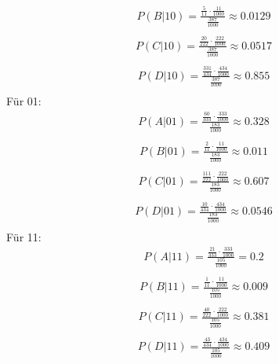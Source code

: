 \begin{align*}
  P(B | 10) = \frac{ \frac{ 5 }{ 11 } \cdot \frac{ 11 }{ 1000 } }{ \frac{ 387 }{ 1000 }  } \approx  0.0129\\
\end{align*}
\begin{align*}
  P(C | 10) = \frac{ \frac{ 20 }{ 222 } \cdot \frac{ 222 }{ 1000 } }{ \frac{ 387 }{ 1000 }  } \approx  0.0517\\
\end{align*}
\begin{align*}
  P(D | 10) = \frac{ \frac{ 331 }{ 434 } \cdot \frac{ 434 }{ 1000 } }{ \frac{ 387 }{ 1000 }  } \approx  0.855\\
\end{align*}
Für 01:
\begin{align*}
  P(A | 01) = \frac{ \frac{ 60 }{ 333 } \cdot \frac{ 333 }{ 1000 } }{ \frac{ 183 }{ 1000 }  } \approx  0.328\\
\end{align*}
\begin{align*}
  P(B | 01) = \frac{ \frac{ 2 }{ 11 } \cdot \frac{ 11 }{ 1000 } }{ \frac{ 183 }{ 1000 }  } \approx  0.011\\
\end{align*}
\begin{align*}
  P(C | 01) = \frac{ \frac{ 111 }{ 222 } \cdot \frac{ 222 }{ 1000 } }{ \frac{ 183 }{ 1000 }  } \approx  0.607\\
\end{align*}
\begin{align*}
  P(D | 01) = \frac{ \frac{ 10 }{ 434 } \cdot \frac{ 434 }{ 1000 } }{ \frac{ 183 }{ 1000 }  } \approx  0.0546\\
\end{align*}
Für 11:
\begin{align*}
  P(A | 11) = \frac{ \frac{ 21 }{ 333 } \cdot \frac{ 333 }{ 1000 } }{ \frac{ 105 }{ 1000 }  } = 0.2\\
\end{align*}
\begin{align*}
  P(B | 11) = \frac{ \frac{ 1 }{ 11 } \cdot \frac{ 11 }{ 1000 } }{ \frac{ 105 }{ 1000 }  } \approx  0.009\\
\end{align*}
\begin{align*}
  P(C | 11) = \frac{ \frac{ 40 }{ 222 } \cdot \frac{ 222 }{ 1000 } }{ \frac{ 105 }{ 1000 }  } \approx  0.381\\
\end{align*}
\begin{align*}
  P(D | 11) = \frac{ \frac{ 43 }{ 434 } \cdot \frac{ 434 }{ 1000 } }{ \frac{ 105 }{ 1000 }  } \approx  0.409\\
\end{align*}